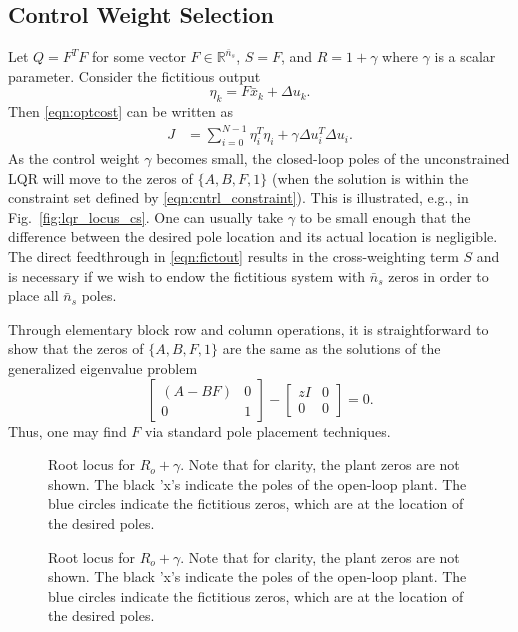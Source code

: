 \documentclass[journal,twocolumn,twoside]{IEEEtran}
\newcommand{\xd}{\ensuremath{\bar x }\xspace}
\begin{document}
\subsection{Control Weight Selection}
Let $Q = F^TF$ for some vector $F\in\mathds{R}^{\bar{n}_s}$, $S=F$, and $R=1+\gamma$ where $\gamma$ is a scalar parameter. Consider the fictitious output
\begin{equation}
  \eta_k = F\xd_k + \Delta u_k. \label{eqn:fictout}
\end{equation}
Then \eqref{eqn:optcost} can be written as
\begin{align}
  J &= \sum_{i=0}^{N-1} \eta_i^T\eta_i + \gamma\Delta u_i^T \Delta u_i.
\end{align}
As the control weight $\gamma$ becomes small, the closed-loop poles of the unconstrained LQR
will move to the zeros of $\{A, B, F, 1\}$ (when the solution is within the constraint set defined by \eqref{eqn:cntrl_constraint}). This is illustrated, e.g., in Fig.~\ref{fig:lqr_locus_cs}. One can usually take $\gamma$ to be small enough that the difference between the desired pole location and its actual location is negligible. The direct feedthrough in \eqref{eqn:fictout} results in the cross-weighting term $S$ and is necessary if we wish to endow the fictitious system with $\bar{n}_s$ zeros in order to place all $\bar{n}_s$ poles.

Through elementary block row and column operations, it is straightforward to show that the zeros of
$\{A, B, F, 1\}$ are the same as the solutions of the generalized eigenvalue problem
\begin{equation}
  \begin{bmatrix}
    (A - BF) & 0\\
    0 & 1
  \end{bmatrix} - \begin{bmatrix}zI & 0\\0 & 0\end{bmatrix} = 0.
\end{equation}
Thus, one may find $F$ via standard pole placement techniques.

\begin{figure*}
  \begin{minipage}{0.48\textwidth}
  
  \caption{Root locus for $R_o + \gamma$. Note that for clarity, the plant zeros are not shown. The black 'x's indicate the poles of the open-loop plant. The blue circles indicate the fictitious zeros, which are at the location of the desired poles. }
  \label{fig:lqr_locus_cs}
\end{minipage}
\hfill
\begin{minipage}{0.48\textwidth}
  
  \caption{Root locus for $R_o + \gamma$. Note that for clarity, the plant zeros are not shown. The black 'x's indicate the poles of the open-loop plant. The blue circles indicate the fictitious zeros, which are at the location of the desired poles.}
  \label{fig:lqr_locus_cz}
\end{minipage}
\end{figure*}
\end{document}
